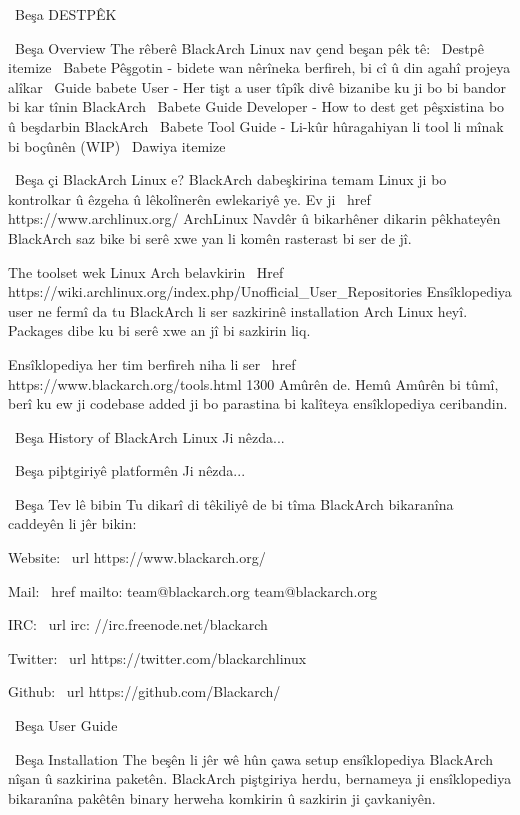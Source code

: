 
\ Beşa {DESTPÊK}

\ Beşa {Overview}
The rêberê BlackArch Linux nav çend beşan pêk tê:
\ Destpê {itemize}
\ Babete Pêşgotin - bidete wan nêrîneka berfireh, bi cî û din agahî projeya alîkar
\ Guide babete User - Her tişt a user tîpîk divê bizanibe ku ji bo bi bandor bi kar tînin BlackArch
\ Babete Guide Developer - How to dest get pêşxistina bo û beşdarbin BlackArch
\ Babete Tool Guide - Li-kûr hûragahiyan li tool li mînak bi boçûnên (WIP)
\ Dawiya {itemize}

\ Beşa {çi BlackArch Linux e?}
BlackArch dabeşkirina temam Linux ji bo kontrolkar û êzgeha û lêkolînerên ewlekariyê ye.
Ev ji \ href {https://www.archlinux.org/} {ArchLinux} Navdêr û bikarhêner dikarin pêkhateyên BlackArch saz bike
bi serê xwe yan li komên rasterast bi ser de jî.

The toolset wek Linux Arch belavkirin
\ Href {https://wiki.archlinux.org/index.php/Unofficial\_User\_Repositories}
{Ensîklopediya user ne fermî} da tu BlackArch li ser sazkirinê
installation Arch Linux heyî. Packages dibe ku bi serê xwe an jî bi sazkirin
liq.

Ensîklopediya her tim berfireh niha li ser \ href {https://www.blackarch.org/tools.html} {1300} Amûrên de.
Hemû Amûrên bi tûmî, berî ku ew ji codebase added ji bo parastina bi kalîteya ensîklopediya ceribandin.

\ Beşa {History of BlackArch Linux}
Ji nêzda...

\ Beşa {piþtgiriyê platformên}
Ji nêzda...

\ Beşa {Tev lê bibin}
Tu dikarî di têkiliyê de bi tîma BlackArch bikaranîna caddeyên li jêr bikin:

Website: \ url {https://www.blackarch.org/}

Mail: \ href {mailto: team@blackarch.org} {team@blackarch.org}

IRC: \ url {irc: //irc.freenode.net/blackarch}

Twitter: \ url {https://twitter.com/blackarchlinux}

Github: \ url {https://github.com/Blackarch/}



\ Beşa {User Guide}

\ Beşa {Installation}
The beşên li jêr wê hûn çawa setup ensîklopediya BlackArch nîşan û
sazkirina paketên. BlackArch piştgiriya herdu, bernameya ji ensîklopediya bikaranîna
pakêtên binary herweha komkirin û sazkirin ji çavkaniyên.

